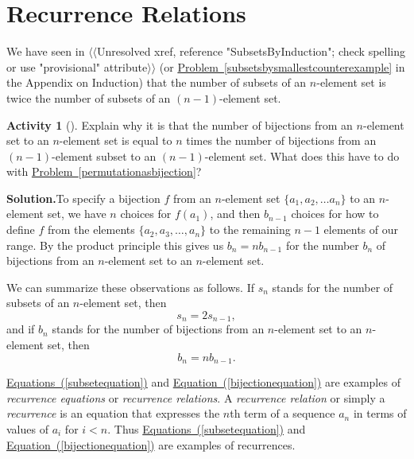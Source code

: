 \documentclass[10pt,]{book}
\theoremstyle{plain}
\theoremstyle{definition}
\newtheorem{activity}[project]{Activity}
\numberwithin{equation}{chapter}
\newcommand{\lt}{<}
\begin{document}
\section[{Recurrence Relations}]{Recurrence Relations}\label{sec_induction-recurrence}
We have seen in {$\langle\langle$Unresolved xref, reference "SubsetsByInduction"; check spelling or use "provisional" attribute$\rangle\rangle$} (or \hyperref[subsetsbysmallestcounterexample]{Problem~\ref{subsetsbysmallestcounterexample}} in the Appendix on Induction) that the number of subsets of an \(n\)-element set is twice the number of subsets of an \((n-1)\)-element set.%
\begin{activity}[]\label{activity-83}
Explain why it is that the number of bijections from an \(n\)-element set to an \(n\)-element set is equal to \(n\) times the number of bijections from an \((n-1)\)-element subset to an \((n-1)\)-element set. What does this have to do with \hyperref[permutationasbijection]{Problem~\ref{permutationasbijection}}?%
\par\medskip\noindent%
\textbf{Solution.}\quad To specify a bijection \(f\) from an \(n\)-element set \(\{a_1,a_2,
\ldots a_n\}\) to an \(n\)-element set, we have \(n\) choices for \(f(a_1)\), and then \(b_{n-1}\) choices for how to define \(f\) from the elements \(\{a_2,a_3, \ldots,a_n\}\) to the remaining \(n-1\) elements of our range. By the product principle this gives us \(b_n=nb_{n-1}\) for the number \(b_n\) of bijections from an \(n\)-element set to an \(n\)-element set.%
\end{activity}
We can summarize these observations as follows. If \(s_n\) stands for the number of subsets of an \(n\)-element set, then%
\begin{equation}
s_n =2s_{n-1},\label{subsetequation}
\end{equation}
and if \(b_n\) stands for the number of bijections from an \(n\)-element set to an \(n\)-element set, then%
\begin{equation}
b_n =
nb_{n-1}.\label{bijectionequation}
\end{equation}
%
\par
\hyperref[subsetequation]{Equations~(\ref{subsetequation})} and \hyperref[bijectionequation]{Equation~(\ref{bijectionequation})} are examples of \emph{recurrence equations} or \emph{recurrence relations}. A \emph{recurrence relation} or simply a \emph{recurrence} is an equation that expresses the \(n\)th term of a sequence \(a_n\) in terms of values of \(a_i\) for \(i\lt n\). Thus \hyperref[subsetequation]{Equations~(\ref{subsetequation})} and \hyperref[bijectionequation]{Equation~(\ref{bijectionequation})} are examples of recurrences.%
\typeout{************************************************}
\typeout{************************************************}
\end{document}
